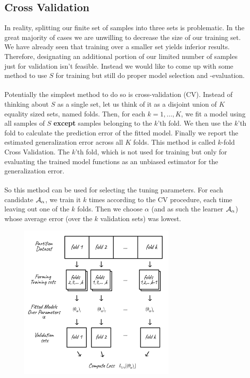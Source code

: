 \subsection{Cross Validation}
In reality, splitting our finite set of samples into three sets is problematic. In the great majority of cases we are unwilling to decrease the size of our training set. We have already seen that training over a smaller set yields inferior results. Therefore, designating an additional portion of our limited number of samples just for validation isn't feasible. Instead we would like to come up with some method to use $S$ for training but still do proper model selection and -evaluation.
\\~\\
Potentially the simplest method to do so is cross-validation (CV). Instead of thinking about $S$ as a single set, let us think of it as a disjoint union of $K$ equality sized sets, named folds. Then, for each $k=1,\ldots,K$, we fit a model using all samples of $S$ \textbf{except} samples belonging to the $k$'th fold. We then use the $k$'th fold to calculate the prediction error of the fitted model. Finally we report the estimated generalization error across all $K$ folds. This method is called $k$-fold Cross Validation. The $k$'th fold, which is not used for training but only for evaluating the trained model functions as an unbiased estimator for the generalization error.
\\~\\
So this method can be used for selecting the  tuning parameters. For each candidate $\mathcal{A}_\alpha$, we train it $k$ times according to the CV procedure, each time leaving out one of the $k$ folds. Then we choose $\alpha$ (and as such the learner $\mathcal{A}_\alpha$) whose average error (over the $k$ validation sets) was lowest.
\begin{figure}[!h]
	\centering
	\includegraphics[width=0.7\textwidth]{chapters/regularization.model.selection/figures/6.3.png}
	\caption{}
\end{figure}
